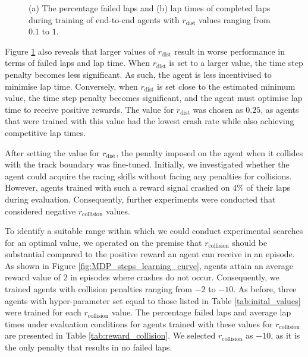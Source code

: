 \begin{figure}[htb!]
    \centering
    
    \caption[Learning curves of agents with different values for $r_{\text{dist}}$ during training]{(a) The percentage failed laps and (b) lap times of completed laps during training of end-to-end agents with $r_{\text{dist}}$ values ranging from $0.1$ to $1$.}
    \label{fig:reward_signal_dist}
\end{figure}


Figure \ref{fig:reward_signal_dist} also reveals that larger values of $r_{\text{dist}}$ result in worse performance in terms of failed laps and lap time.
When $r_{\text{dist}}$ is set to a larger value, the time step penalty becomes less significant.
As such, the agent is less incentivised to minimise lap time.
Conversely, when $r_{\text{dist}}$ is set close to the estimated minimum value, the time step penalty becomes significant, and the agent must optimise lap time to receive positive rewards.
The value for $r_{\text{dist}}$ was chosen as $0.25$, as agents that were trained with this value had the lowest crash rate while also achieving competitive lap times.


After setting the value for $r_{\text{dist}}$, the penalty imposed on the agent when it collides with the track boundary was fine-tuned. 
Initially, we investigated whether the agent could acquire the racing skills without facing any penalties for collisions. 
However, agents trained with such a reward signal crashed on $4\%$ of their laps during evaluation. 
Consequently, further experiments were conducted that considered negative $r_{\text{collision}}$ values.

To identify a suitable range within which we could conduct experimental searches for an optimal value, we operated on the premise that $r_{\text{collision}}$ should be substantial compared to the positive reward an agent can receive in an episode. 
As shown in Figure \ref{fig:MDP_steps_learning_curve}, agents attain an average reward value of $2$ in episodes where crashes do not occur. 
Consequently, we trained agents with collision penalties ranging from $-2$ to $-10$.
As before, three agents with hyper-parameter set equal to those listed in Table \ref{tab:inital_values} were trained for each $r_{\text{collision}}$ value.
The percentage failed laps and average lap times under evaluation conditions for agents trained with these values for $r_{\text{collision}}$ are presented in Table \ref{tab:reward_collision}.
We selected $r_{\text{collision}}$ as $-10$, as it is the only penalty that results in no failed laps.

